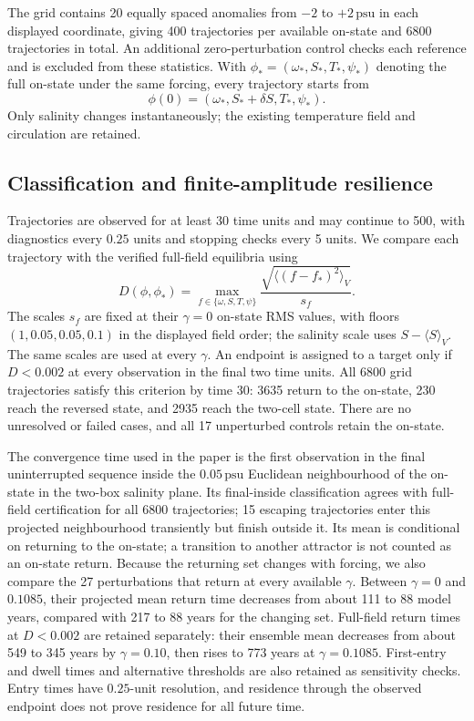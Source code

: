 \documentclass[12pt, a4paper]{article}
\newcommand{\psu}{\,\text{psu}}
\begin{document}
The grid contains 20 equally spaced anomalies from $-2$ to $+2\psu{}$ in each displayed coordinate, giving 400 trajectories per available on-state and 6800 trajectories in total. An additional zero-perturbation control checks each reference and is excluded from these statistics. With $\phi_*=(\omega_*,S_*,T_*,\psi_*)$ denoting the full on-state under the same forcing, every trajectory starts from
\begin{equation}
  \phi(0)=(\omega_*,S_*+\delta S,T_*,\psi_*).
\end{equation}
Only salinity changes instantaneously; the existing temperature field and circulation are retained.

\subsection*{Classification and finite-amplitude resilience}

Trajectories are observed for at least 30 time units and may continue to 500, with diagnostics every $0.25$ units and stopping checks every 5 units. We compare each trajectory with the verified full-field equilibria using
\begin{equation}
  D(\phi,\phi_*)=\max_{f\in\{\omega,S,T,\psi\}}
       \frac{\sqrt{\langle(f-f_*)^2\rangle_V}}{s_f}.
\end{equation}
The scales $s_f$ are fixed at their $\gamma=0$ on-state RMS values, with floors $(1,0.05,0.05,0.1)$ in the displayed field order; the salinity scale uses $S-\langle S\rangle_V$. The same scales are used at every $\gamma$. An endpoint is assigned to a target only if $D<0.002$ at every observation in the final two time units. All 6800 grid trajectories satisfy this criterion by time 30: 3635 return to the on-state, 230 reach the reversed state, and 2935 reach the two-cell state. There are no unresolved or failed cases, and all 17 unperturbed controls retain the on-state.

The convergence time used in the paper is the first observation in the final uninterrupted sequence inside the $0.05\psu{}$ Euclidean neighbourhood of the on-state in the two-box salinity plane. Its final-inside classification agrees with full-field certification for all 6800 trajectories; 15 escaping trajectories enter this projected neighbourhood transiently but finish outside it. Its mean is conditional on returning to the on-state; a transition to another attractor is not counted as an on-state return. Because the returning set changes with forcing, we also compare the 27 perturbations that return at every available $\gamma$. Between $\gamma=0$ and $0.1085$, their projected mean return time decreases from about 111 to 88 model years, compared with 217 to 88 years for the changing set. Full-field return times at $D<0.002$ are retained separately: their ensemble mean decreases from about 549 to 345 years by $\gamma=0.10$, then rises to 773 years at $\gamma=0.1085$. First-entry and dwell times and alternative thresholds are also retained as sensitivity checks. Entry times have $0.25$-unit resolution, and residence through the observed endpoint does not prove residence for all future time.
\end{document}
